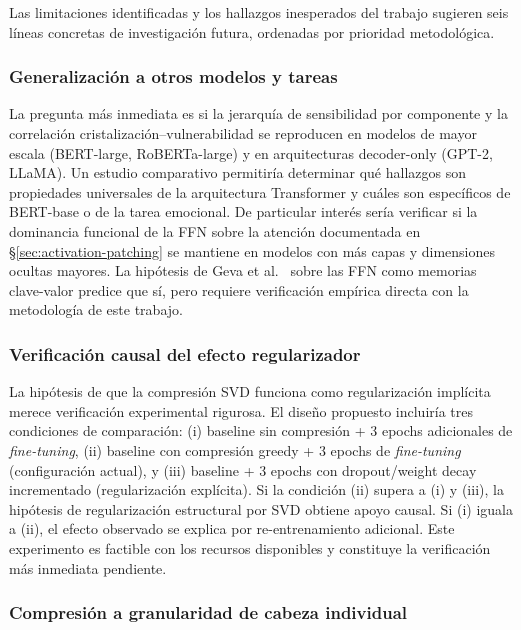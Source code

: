 Las limitaciones identificadas y los hallazgos inesperados del trabajo
sugieren seis líneas concretas de investigación futura, ordenadas por
prioridad metodológica.

\subsubsection{Generalización a otros modelos y tareas}

La pregunta más inmediata es si la jerarquía de sensibilidad por componente
y la correlación cristalización--vulnerabilidad se reproducen en modelos de
mayor escala (BERT-large, RoBERTa-large) y en arquitecturas decoder-only
(GPT-2, LLaMA). Un estudio comparativo permitiría determinar qué hallazgos
son propiedades universales de la arquitectura Transformer y cuáles son
específicos de BERT-base o de la tarea emocional. De particular interés sería
verificar si la dominancia funcional de la FFN sobre la atención
documentada en \S\ref{sec:activation-patching} se mantiene en modelos con más
capas y dimensiones ocultas mayores. La hipótesis de Geva et
al.~\cite{geva2021transformer} sobre las FFN como memorias clave-valor
predice que sí, pero requiere verificación empírica directa con la
metodología de este trabajo.

\subsubsection{Verificación causal del efecto regularizador}

La hipótesis de que la compresión SVD funciona como regularización
implícita merece verificación experimental rigurosa. El diseño propuesto
incluiría tres condiciones de comparación: (i) baseline sin compresión + 3
epochs adicionales de \emph{fine-tuning}, (ii) baseline con compresión greedy +
3 epochs de \emph{fine-tuning} (configuración actual), y (iii) baseline + 3 epochs
con dropout/weight decay incrementado (regularización explícita). Si la
condición (ii) supera a (i) y (iii), la hipótesis de regularización
estructural por SVD obtiene apoyo causal. Si (i) iguala a (ii), el efecto
observado se explica por re-entrenamiento adicional. Este experimento es
factible con los recursos disponibles y constituye la verificación más
inmediata pendiente.

\subsubsection{Compresión a granularidad de cabeza individual}

